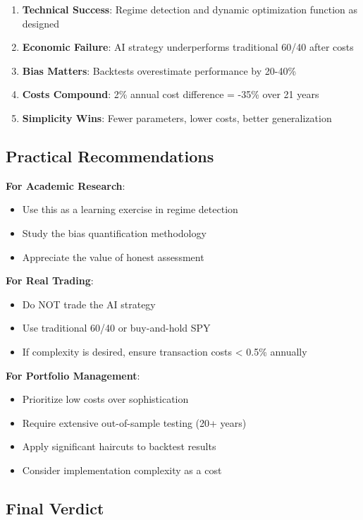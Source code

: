 \documentclass[twocolumn,ieee]{arithmaxresearch}
\begin{document}
\begin{enumerate}
    \item \textbf{Technical Success}: Regime detection and dynamic optimization function as designed
    \item \textbf{Economic Failure}: AI strategy underperforms traditional 60/40 after costs
    \item \textbf{Bias Matters}: Backtests overestimate performance by 20-40\%
    \item \textbf{Costs Compound}: 2\% annual cost difference = -35\% over 21 years
    \item \textbf{Simplicity Wins}: Fewer parameters, lower costs, better generalization
\end{enumerate}

\subsection{Practical Recommendations}

\textbf{For Academic Research}:
\begin{itemize}
    \item Use this as a learning exercise in regime detection
    \item Study the bias quantification methodology
    \item Appreciate the value of honest assessment
\end{itemize}

\textbf{For Real Trading}:
\begin{itemize}
    \item Do NOT trade the AI strategy
    \item Use traditional 60/40 or buy-and-hold SPY
    \item If complexity is desired, ensure transaction costs < 0.5\% annually
\end{itemize}

\textbf{For Portfolio Management}:
\begin{itemize}
    \item Prioritize low costs over sophistication
    \item Require extensive out-of-sample testing (20+ years)
    \item Apply significant haircuts to backtest results
    \item Consider implementation complexity as a cost
\end{itemize}

\subsection{Final Verdict}
\end{document}
